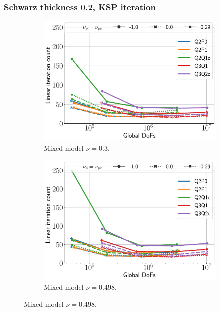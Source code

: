 \documentclass{beamer}
\begin{document}
\begin{frame}
	\frametitle{Schwarz thickness 0.2, KSP iteration}
	\begin{figure}[H]
		\begin{subfigure}{.5\textwidth}
			\centering
			\includegraphics[width=.8\textwidth]{../figs/KSPiter-schwarz1-mixed-0.3.pdf}
			\caption{Mixed model $\nu = 0.3$.}
		\end{subfigure}%
		\begin{subfigure}{.5\textwidth}
			\centering
			\includegraphics[width=.8\textwidth]{../figs/KSPiter-schwarz1-mixed-0.498.pdf}
			\caption{Mixed model $\nu = 0.498$.}
		\end{subfigure}
	\end{figure}
\end{frame}
\end{document}

